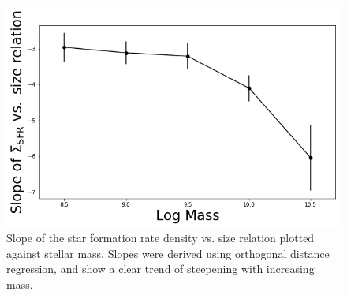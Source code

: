 \documentclass[iop]{emulateapj}
\begin{document}
\begin{figure}
	\centering
	\includegraphics[width= \columnwidth]{slope_sfrdens_size.png}
	\caption{Slope of the star formation rate density vs. size relation plotted against stellar mass. Slopes were derived using orthogonal distance regression, and show a clear trend of steepening with increasing mass.}
	\label{fig:HA_dens_mass}
	
\end{figure}


	

	
\end{document}

